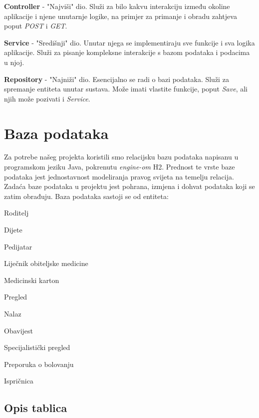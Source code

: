 		\begin{packed_item}
			\item \textbf{Controller} - "Najviši" dio. Služi za bilo kakvu interakciju između okoline aplikacije i njene unutarnje logike, na primjer za primanje i obradu zahtjeva poput \textit{POST} i \textit{GET}.
			\item \textbf{Service} - "Središnji" dio. Unutar njega se implementiraju sve funkcije i sva logika aplikacije. Služi za pisanje kompleksne interakcije s bazom podataka i podacima u njoj.
			\item \textbf{Repository} - "Najniži" dio. Esencijalno se radi o bazi podataka. Služi za spremanje entiteta unutar sustava. Može imati vlastite funkcije, poput \textit{Save}, ali njih može pozivati i \textit{Service}. 
		\end{packed_item}
		\clearpage
		
		
		

				
		\section{Baza podataka}
			
			\text Za potrebe našeg projekta koristili smo relacijsku bazu podataka napisanu u programskom jeziku Java, pokrenutu \textit{engine-om} H2. Prednost te vrste baze podataka jest jednostavnost modeliranja pravog svijeta na temelju relacija. Zadaća baze podataka u projektu jest pohrana, izmjena i dohvat podataka koji se zatim obrađuju. Baza podataka sastoji se od entiteta:
			\begin{packed_item}
				\item Roditelj
				\item Dijete
				\item Pedijatar
				\item Liječnik obiteljske medicine
				\item Medicinski karton
				\item Pregled
				\item Nalaz
				\item Obavijest
				\item Specijalistički pregled
				\item Preporuka o bolovanju
				\item Ispričnica
			\end{packed_item}
		
			\subsection{Opis tablica}
			

